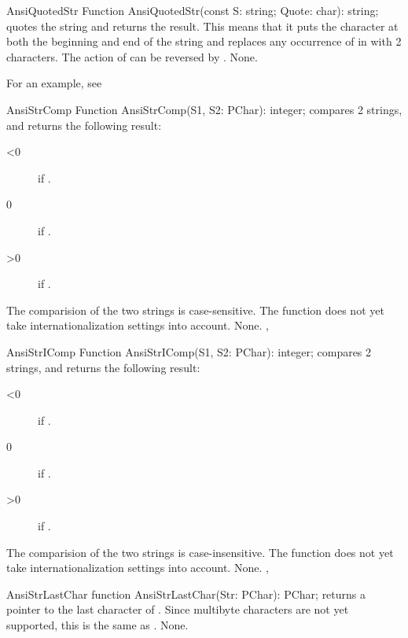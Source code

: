 
 
\begin{function}{AnsiQuotedStr}
\Declaration
Function AnsiQuotedStr(const S: string; Quote: char): string;
\Description
{} quotes the string  and returns the result.
This means that it puts the  character at both the beginning and
end of the string and replaces any occurrence of  in  
with 2  characters. The action of  can be
reversed by .
\Errors
None.
\SeeAlso
{}
\end{function}

For an example, see 
 
\begin{function}{AnsiStrComp}
\Declaration
Function AnsiStrComp(S1, S2: PChar): integer;
\Description
{} compares 2  strings, and returns the following
result:
\begin{description}
\item[<0]  if .
\item[0]  if .
\item[>0]  if .
\end{description}
The comparision of the two strings is case-sensitive.
The function does not yet take internationalization settings into account.
\Errors
None.
\SeeAlso
{}, 
\end{function}


 
\begin{function}{AnsiStrIComp}
\Declaration
Function AnsiStrIComp(S1, S2: PChar): integer;
\Description
{} compares 2  strings, and returns the following
result:
\begin{description}
\item[<0]  if .
\item[0]  if .
\item[>0]  if .
\end{description}
The comparision of the two strings is case-insensitive.
The function does not yet take internationalization settings into account.
\Errors
None.
\SeeAlso
{}, 
\end{function}



\begin{function}{AnsiStrLastChar}
\Declaration
function AnsiStrLastChar(Str: PChar): PChar;
\Declaration
{} returns a pointer to the last character of .
Since multibyte characters are not yet supported, this is the same
as .
\Errors
None.
\SeeAlso
{}
\end{function}

